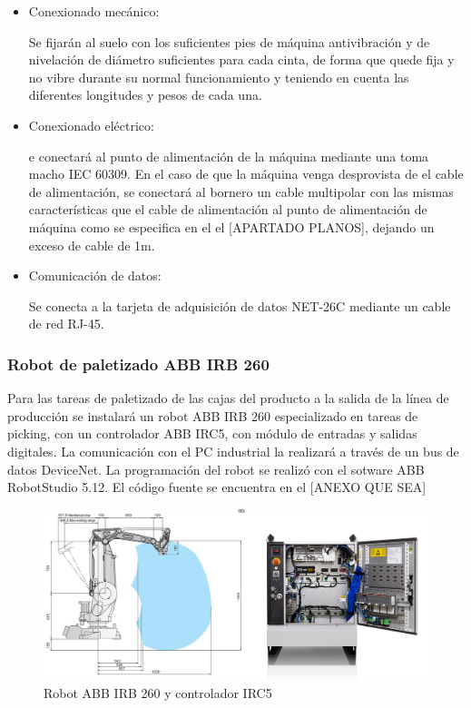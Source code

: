 		\begin{itemize}
				\item{Conexionado mecánico:}
				
				Se fijarán al suelo con los suficientes pies de máquina antivibración y de nivelación de diámetro suficientes para cada cinta, de forma que quede fija y no vibre durante su normal funcionamiento y teniendo en cuenta las diferentes longitudes y pesos de cada una.

				\item{Conexionado eléctrico:}

				e conectará al punto de alimentación de la máquina mediante una  toma macho IEC 60309. En el caso de que la máquina venga desprovista de el cable de alimentación, se conectará al bornero un cable multipolar con las mismas características que el cable de alimentación al punto de alimentación de máquina como se especifica en el el [APARTADO PLANOS], dejando un exceso de cable de 1m. \ 
				
				\item{Comunicación de datos:}

				Se conecta a la tarjeta de adquisición de datos NET-26C mediante un cable de red RJ-45.
		\end{itemize}


\newpage

\subsubsection{Robot de paletizado ABB IRB 260}

	
	
	Para las tareas de paletizado de las cajas del producto a la salida de la línea de producción se instalará un robot ABB IRB 260 especializado en tareas de picking, con un controlador ABB IRC5, con módulo de entradas y salidas digitales. La comunicación con el PC industrial la realizará a través de un bus de datos DeviceNet. La programación del robot se realizó con el sotware ABB RobotStudio 5.12. El código fuente se encuentra en el [ANEXO QUE SEA]\\
	
	\begin{figure}[htp]
		
			\centering
			\includegraphics[scale=0.3]{Datasheets/8Foto.jpg}
			\caption{Robot ABB IRB 260 y controlador IRC5}
			\label{fig:testa}
		
	\end{figure}

